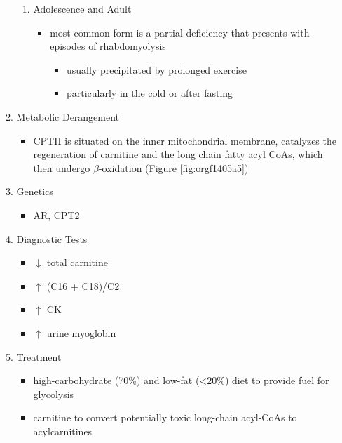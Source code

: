 \documentclass{scrartcl}
\begin{document}
\begin{enumerate}
\begin{enumerate}
\begin{enumerate}
\item Adolescence and Adult
\label{sec:org94575ec}
\begin{itemize}
\item most common form is a partial deficiency that presents with
episodes of rhabdomyolysis
\begin{itemize}
\item usually precipitated by prolonged exercise
\item particularly in the cold or after fasting
\end{itemize}
\end{itemize}
\end{enumerate}

\item Metabolic Derangement
\label{sec:orgbef86c5}
\begin{itemize}
\item CPTII is situated on the inner mitochondrial membrane, catalyzes the
regeneration of carnitine and the long chain fatty acyl CoAs, which
then undergo \(\beta\)-oxidation (Figure \ref{fig:orgf1405a5})
\end{itemize}
\item Genetics
\label{sec:org5ece9a9}
\begin{itemize}
\item AR, CPT2
\end{itemize}
\item Diagnostic Tests
\label{sec:orgee6a410}
\begin{itemize}
\item \(\downarrow\) total carnitine
\item \(\uparrow\) (C16 + C18)/C2
\item \(\uparrow\) CK
\item \(\uparrow\) urine myoglobin
\end{itemize}
\item Treatment
\label{sec:org7281ad0}
\begin{itemize}
\item high-carbohydrate (70\%) and low-fat (<20\%) diet to provide fuel for glycolysis
\item carnitine to convert potentially toxic long-chain acyl-CoAs to
acylcarnitines
\end{itemize}
\end{enumerate}
\end{enumerate}
\end{document}

